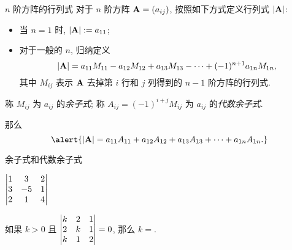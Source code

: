 \begin{frame}{$n$ 阶方阵的行列式}
	\onslide<+->
	对于 $n$ 阶方阵 ${\mathbf{A}}=(a_{ij})$, 按照如下方式定义行列式 $|{\mathbf{A}}|$:
	\onslide<+->
	\begin{definition}
		\begin{itemize}
			\item 当 $n=1$ 时, $|{\mathbf{A}}|:=a_{11}$;
			\item 对于一般的 $n$, 归纳定义
			\[|{\mathbf{A}}|=a_{11}M_{11}-a_{12}M_{12}+a_{13}M_{13}-\cdots+(-1)^{n+1}a_{1n}M_{1n},\]
			其中 $M_{ij}$ 表示 ${\mathbf{A}}$ 去掉第 $i$ 行和 $j$ 列得到的 $n-1$ 阶方阵的行列式.
		\end{itemize}
	\end{definition}
	\onslide<+->
	\begin{definition}
		称 $M_{ij}$ 为 $a_{ij}$ 的\emph{余子式}; 称 $A_{ij}=(-1)^{i+j}M_{ij}$ 为 $a_{ij}$ 的\emph{代数余子式}.		
	\end{definition}
	\onslide<+->
	那么
	\[\alert{|\bfA|=a_{11}A_{11}+a_{12}A_{12}+a_{13}A_{13}+\cdots+a_{1n}A_{1n}.}\]
\end{frame}


\begin{frame}{余子式和代数余子式}
	\vspace{-.3\baselineskip}
	\onslide<+->
	\begin{example}
		$\left|\begin{matrix}1&3&2\\3&-5&1\\2&1&4\end{matrix}\right|$
		\onslide<+->{$=1\times (-5)\times 4+3\times 1\times2+2\times3\times1-1\times1\times1-3\times3\times4-2\times(-5)\times2$}


	\end{example}
	\onslide<+->
	\begin{exercise}
		\vspace{-.4\baselineskip}
		如果 $k>0$ 且 $\left|\begin{matrix}k&2&1\\2&k&1\\k&1&2\end{matrix}\right|=0$, 那么 $k=$.
	\end{exercise}
\end{frame}


